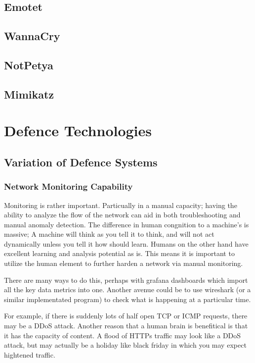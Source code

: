 
\section{Emotet}
\section{WannaCry}
\section{NotPetya}
\section{Mimikatz}



\chapter{Defence Technologies}
\section{Variation of Defence Systems}
\subsection{Network Monitoring Capability}
Monitoring is rather important. Particually in a manual capacity; having the ability to analyze the flow of the network can aid in both troubleshooting and manual anomaly detection. The difference in human congnition to a machine's is massive; A machine will think as you tell it to think,
and will not act dynamically unless you tell it how should learn. Humans on the other hand have excellent learning and analysis potential as is. This means it is important to utilize the human element to further harden a network via manual monitoring. 

There are many ways to do this, perhaps with grafana dashboards which import all the key data metrics into one. Another avenue could be to use wireshark (or a similar implementated program) to check what is happening at a particular time. 

For example, if there is suddenly lots of half open TCP or ICMP requests, there may be a DDoS attack. Another reason that a human brain is benefitical is that it has the capacity of content. A flood of HTTPs traffic may look like a DDoS attack, 
but may actually be a holiday like black friday in which you may expect hightened traffic.

